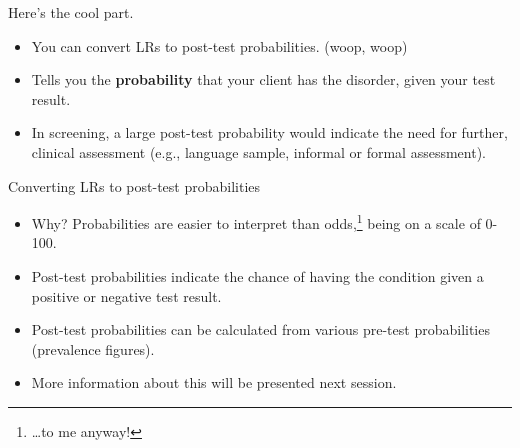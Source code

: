 \documentclass{beamer}
\begin{document}
\begin{frame}{Here's the cool part.}
	\begin{itemize}
	\item You can convert LRs to post-test probabilities. (woop, woop)
	\item Tells you the \textbf{probability} that your client has the disorder, given your test result.
	\item In screening, a large post-test probability would indicate the need for further, clinical assessment (e.g., language sample, informal or formal assessment).
	\end{itemize}
\end{frame}

\begin{frame}{Converting LRs to post-test probabilities}
	\begin{itemize}
	\item Why? Probabilities are easier to interpret than odds,\footnote{\dots to me anyway!} being on a scale of 0-100.
	\item Post-test probabilities indicate the chance of having the condition given a positive or negative test result.
	\item Post-test probabilities can be calculated from various pre-test probabilities (prevalence figures).
	\item More information about this will be presented next session.
	\end{itemize}
\end{frame}



\end{document}

